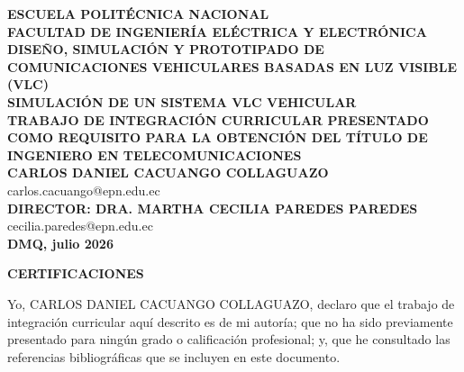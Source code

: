 \begin{titlepage}
    \centering
    
    {\fontsize{24}{36}\bfseries\sffamily ESCUELA POLITÉCNICA NACIONAL}\\[2.0cm]
    
    {\fontsize{16}{24}\bfseries\sffamily FACULTAD DE INGENIERÍA ELÉCTRICA Y ELECTRÓNICA}\\[3cm]
    
    {\fontsize{14}{21}\bfseries\sffamily DISEÑO, SIMULACIÓN Y PROTOTIPADO DE COMUNICACIONES VEHICULARES BASADAS EN LUZ VISIBLE (VLC)}\\[0.5cm]
    
    {\fontsize{14}{21}\bfseries\sffamily SIMULACIÓN DE UN SISTEMA VLC VEHICULAR}\\[2.0cm]
    
    
    
    {\fontsize{12}{18}\bfseries\sffamily TRABAJO DE INTEGRACIÓN CURRICULAR PRESENTADO COMO REQUISITO PARA LA OBTENCIÓN DEL TÍTULO DE INGENIERO EN TELECOMUNICACIONES}\\[2.5cm]
    
    {\fontsize{12}{18}\bfseries\sffamily CARLOS DANIEL CACUANGO COLLAGUAZO}\\
    {\fontsize{12}{18}\sffamily carlos.cacuango@epn.edu.ec}\\[2.0cm]
    
    {\fontsize{12}{18}\bfseries\sffamily DIRECTOR: DRA. MARTHA CECILIA PAREDES PAREDES}\\
    {\fontsize{12}{18}\sffamily cecilia.paredes@epn.edu.ec}\\[2.5cm]
    
    {\fontsize{12}{18}\bfseries\sffamily DMQ, julio 2026}
\end{titlepage}

\clearpage
{}
\setcounter{page}{1}

\begin{center}
    {\fontsize{14}{17}\bfseries\sffamily CERTIFICACIONES}
\end{center}
\vspace{1.0cm}

\noindent Yo, CARLOS DANIEL CACUANGO COLLAGUAZO, declaro que el trabajo de integración curricular aquí descrito es de mi autoría; que no ha sido previamente presentado para ningún grado o calificación profesional; y, que he consultado las referencias bibliográficas que se incluyen en este documento.

